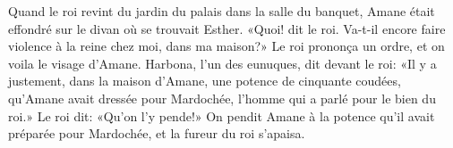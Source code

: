 Quand le roi revint du jardin du palais dans la salle du banquet,
	Amane était effondré sur le divan où se trouvait Esther.
«Quoi! dit le roi. Va-t-il encore faire violence à la reine chez moi, dans ma maison?»
Le roi prononça un ordre, et on voila le visage d’Amane.
Harbona, l’un des eunuques, dit devant le roi:
	«Il y a justement, dans la maison d’Amane, une potence de cinquante coudées,
	qu’Amane avait dressée pour Mardochée, l’homme qui a parlé pour le bien du roi.»
Le roi dit: «Qu’on l’y pende!»
On pendit Amane à la potence qu’il avait préparée pour Mardochée,
	et la fureur du roi s’apaisa.
